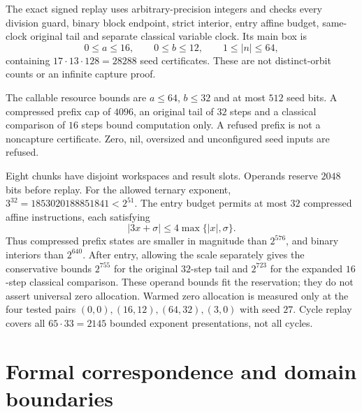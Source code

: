 \documentclass[11pt,letterpaper]{article}
\begin{document}
The exact signed replay uses arbitrary-precision integers and checks every
division guard, binary block endpoint, strict interior, entry affine budget,
same-clock original tail and separate classical variable clock.
Its main box is
\[
0\le a\le16,\qquad 0\le b\le12,\qquad1\le|n|\le64,
\]
containing \(17\cdot13\cdot128=28288\) seed certificates.
These are not distinct-orbit counts or an infinite capture proof.

The callable resource bounds are \(a\le64\), \(b\le32\) and at most
\(512\) seed bits. A compressed prefix cap of \(4096\), an original tail of
\(32\) steps and a classical comparison of \(16\) steps bound computation
only. A refused prefix is not a noncapture certificate.
Zero, nil, oversized and unconfigured seed inputs are refused.

Eight chunks have disjoint workspaces and result slots.
Operands reserve \(2048\) bits before replay.
For the allowed ternary exponent, \(3^{32}=1853020188851841<2^{51}\).
The entry budget permits at most \(32\) compressed affine instructions,
each satisfying
\[
|3x+\sigma|\le4\max\{|x|,\sigma\}.
\]
Thus compressed prefix states are smaller in magnitude than \(2^{576}\),
and binary interiors than \(2^{640}\).
After entry, allowing the scale separately gives the conservative bounds
\(2^{755}\) for the original \(32\)-step tail and \(2^{723}\) for the
expanded \(16\)-step classical comparison.
These operand bounds fit the reservation; they do not assert universal
zero allocation. Warmed zero allocation is measured only at the four
tested pairs \((0,0),(16,12),(64,32),(3,0)\) with seed \(27\).
Cycle replay covers all \(65\cdot33=2145\) bounded exponent presentations,
not all cycles.

\section{Formal correspondence and domain boundaries}
\end{document}
